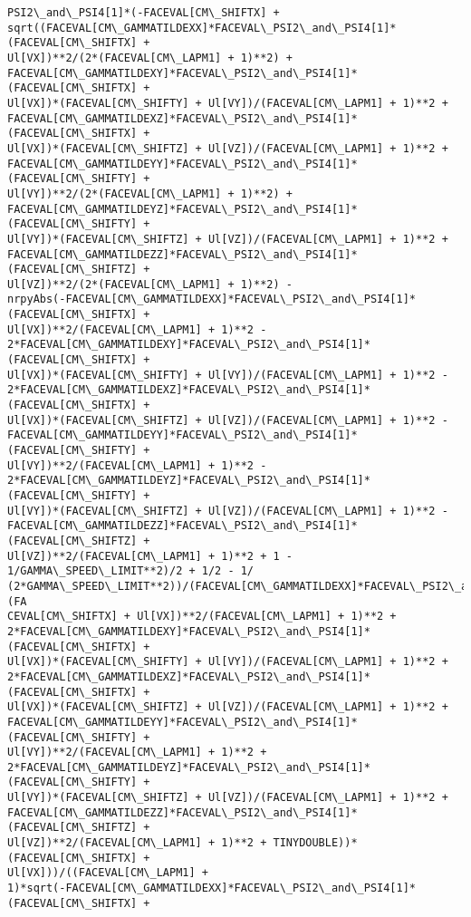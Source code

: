 \documentclass[landscape,letterpaper,10pt,english]{article}
\begin{document}
\begin{Verbatim}[commandchars=\\\{\}]
PSI2\_and\_PSI4[1]*(-FACEVAL[CM\_SHIFTX] +
sqrt((FACEVAL[CM\_GAMMATILDEXX]*FACEVAL\_PSI2\_and\_PSI4[1]*(FACEVAL[CM\_SHIFTX] +
Ul[VX])**2/(2*(FACEVAL[CM\_LAPM1] + 1)**2) +
FACEVAL[CM\_GAMMATILDEXY]*FACEVAL\_PSI2\_and\_PSI4[1]*(FACEVAL[CM\_SHIFTX] +
Ul[VX])*(FACEVAL[CM\_SHIFTY] + Ul[VY])/(FACEVAL[CM\_LAPM1] + 1)**2 +
FACEVAL[CM\_GAMMATILDEXZ]*FACEVAL\_PSI2\_and\_PSI4[1]*(FACEVAL[CM\_SHIFTX] +
Ul[VX])*(FACEVAL[CM\_SHIFTZ] + Ul[VZ])/(FACEVAL[CM\_LAPM1] + 1)**2 +
FACEVAL[CM\_GAMMATILDEYY]*FACEVAL\_PSI2\_and\_PSI4[1]*(FACEVAL[CM\_SHIFTY] +
Ul[VY])**2/(2*(FACEVAL[CM\_LAPM1] + 1)**2) +
FACEVAL[CM\_GAMMATILDEYZ]*FACEVAL\_PSI2\_and\_PSI4[1]*(FACEVAL[CM\_SHIFTY] +
Ul[VY])*(FACEVAL[CM\_SHIFTZ] + Ul[VZ])/(FACEVAL[CM\_LAPM1] + 1)**2 +
FACEVAL[CM\_GAMMATILDEZZ]*FACEVAL\_PSI2\_and\_PSI4[1]*(FACEVAL[CM\_SHIFTZ] +
Ul[VZ])**2/(2*(FACEVAL[CM\_LAPM1] + 1)**2) -
nrpyAbs(-FACEVAL[CM\_GAMMATILDEXX]*FACEVAL\_PSI2\_and\_PSI4[1]*(FACEVAL[CM\_SHIFTX] +
Ul[VX])**2/(FACEVAL[CM\_LAPM1] + 1)**2 -
2*FACEVAL[CM\_GAMMATILDEXY]*FACEVAL\_PSI2\_and\_PSI4[1]*(FACEVAL[CM\_SHIFTX] +
Ul[VX])*(FACEVAL[CM\_SHIFTY] + Ul[VY])/(FACEVAL[CM\_LAPM1] + 1)**2 -
2*FACEVAL[CM\_GAMMATILDEXZ]*FACEVAL\_PSI2\_and\_PSI4[1]*(FACEVAL[CM\_SHIFTX] +
Ul[VX])*(FACEVAL[CM\_SHIFTZ] + Ul[VZ])/(FACEVAL[CM\_LAPM1] + 1)**2 -
FACEVAL[CM\_GAMMATILDEYY]*FACEVAL\_PSI2\_and\_PSI4[1]*(FACEVAL[CM\_SHIFTY] +
Ul[VY])**2/(FACEVAL[CM\_LAPM1] + 1)**2 -
2*FACEVAL[CM\_GAMMATILDEYZ]*FACEVAL\_PSI2\_and\_PSI4[1]*(FACEVAL[CM\_SHIFTY] +
Ul[VY])*(FACEVAL[CM\_SHIFTZ] + Ul[VZ])/(FACEVAL[CM\_LAPM1] + 1)**2 -
FACEVAL[CM\_GAMMATILDEZZ]*FACEVAL\_PSI2\_and\_PSI4[1]*(FACEVAL[CM\_SHIFTZ] +
Ul[VZ])**2/(FACEVAL[CM\_LAPM1] + 1)**2 + 1 - 1/GAMMA\_SPEED\_LIMIT**2)/2 + 1/2 - 1/
(2*GAMMA\_SPEED\_LIMIT**2))/(FACEVAL[CM\_GAMMATILDEXX]*FACEVAL\_PSI2\_and\_PSI4[1]*(FA
CEVAL[CM\_SHIFTX] + Ul[VX])**2/(FACEVAL[CM\_LAPM1] + 1)**2 +
2*FACEVAL[CM\_GAMMATILDEXY]*FACEVAL\_PSI2\_and\_PSI4[1]*(FACEVAL[CM\_SHIFTX] +
Ul[VX])*(FACEVAL[CM\_SHIFTY] + Ul[VY])/(FACEVAL[CM\_LAPM1] + 1)**2 +
2*FACEVAL[CM\_GAMMATILDEXZ]*FACEVAL\_PSI2\_and\_PSI4[1]*(FACEVAL[CM\_SHIFTX] +
Ul[VX])*(FACEVAL[CM\_SHIFTZ] + Ul[VZ])/(FACEVAL[CM\_LAPM1] + 1)**2 +
FACEVAL[CM\_GAMMATILDEYY]*FACEVAL\_PSI2\_and\_PSI4[1]*(FACEVAL[CM\_SHIFTY] +
Ul[VY])**2/(FACEVAL[CM\_LAPM1] + 1)**2 +
2*FACEVAL[CM\_GAMMATILDEYZ]*FACEVAL\_PSI2\_and\_PSI4[1]*(FACEVAL[CM\_SHIFTY] +
Ul[VY])*(FACEVAL[CM\_SHIFTZ] + Ul[VZ])/(FACEVAL[CM\_LAPM1] + 1)**2 +
FACEVAL[CM\_GAMMATILDEZZ]*FACEVAL\_PSI2\_and\_PSI4[1]*(FACEVAL[CM\_SHIFTZ] +
Ul[VZ])**2/(FACEVAL[CM\_LAPM1] + 1)**2 + TINYDOUBLE))*(FACEVAL[CM\_SHIFTX] +
Ul[VX]))/((FACEVAL[CM\_LAPM1] +
1)*sqrt(-FACEVAL[CM\_GAMMATILDEXX]*FACEVAL\_PSI2\_and\_PSI4[1]*(FACEVAL[CM\_SHIFTX] +

\end{Verbatim}
\end{document}
